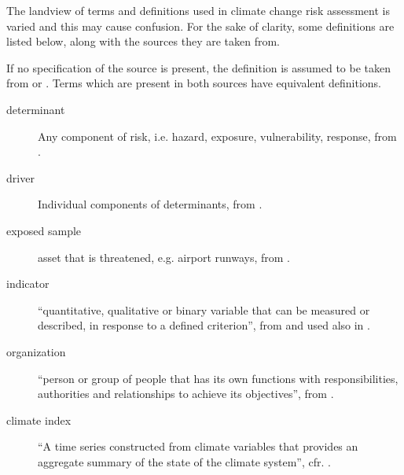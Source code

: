 The landview of terms and definitions used in climate change risk assessment is varied and this may cause confusion. For the sake of clarity, some definitions are listed below, along with the sources they are taken from.

If no specification of the source is present, the definition is assumed to be taken from \cite{2021ISO14091} or \cite{2021MatthewsAnnexVII}. Terms which are present in both sources have equivalent definitions.

\begin{description}
  \item[determinant] Any component of risk, i.e. hazard, exposure, vulnerability, response, from \cite[493]{2023SimpsonAdaptationTo}.
  \item[driver] Individual components of determinants, from \cite[493]{2023SimpsonAdaptationTo}.
  \item[exposed sample] asset that is threatened, e.g. airport runways, from \cite[553]{2022DeVivoRiskAssessment}.
  \item[indicator] ``quantitative, qualitative or binary variable that can be measured or described, in response to a defined criterion'', from \cite{2021ISO14091} and used also in \cite{2022DeVivoRiskAssessment,2023DeVivoApplicationOf,2023DeVivoClimate-RiskAssessment}.
  \item[organization] ``person or group of people that has its own functions with responsibilities, authorities and relationships to achieve its objectives'', from \cite{2021ISO14091}.
  \item[climate index] ``A time series constructed from climate variables that provides an aggregate summary of the state of the climate system'', cfr. \cite{2021MatthewsAnnexVII}.
\end{description}
